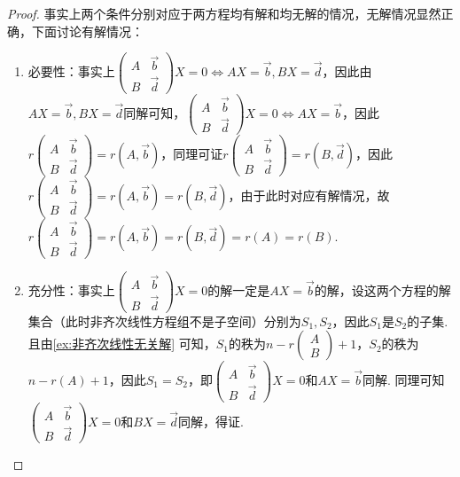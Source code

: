 \begin{proof}
    事实上两个条件分别对应于两方程均有解和均无解的情况，无解情况显然正确，下面讨论有解情况：
    \begin{enumerate}
        \item 必要性：事实上$\begin{pmatrix}
                      A & \vec{b} \\ B & \vec{d}
                  \end{pmatrix}X=0\iff AX=\vec{b},BX=\vec{d}$，因此由$AX=\vec{b},BX=\vec{d}$同解可知，$\begin{pmatrix}
                      A & \vec{b} \\ B & \vec{d}
                  \end{pmatrix}X=0\iff AX=\vec{b}$，因此$r\begin{pmatrix}
                      A & \vec{b} \\ B & \vec{d}
                  \end{pmatrix}=r(A,\vec{b})$，同理可证$r\begin{pmatrix}
                      A & \vec{b} \\ B & \vec{d}
                  \end{pmatrix}=r(B,\vec{d})$，因此$r\begin{pmatrix}
                      A & \vec{b} \\ B & \vec{d}
                  \end{pmatrix}=r(A,\vec{b})=r(B,\vec{d})$，由于此时对应有解情况，故$r\begin{pmatrix}
                      A & \vec{b} \\ B & \vec{d}
                  \end{pmatrix}=r(A,\vec{b})=r(B,\vec{d})=r(A)=r(B)$.

        \item 充分性：事实上$\begin{pmatrix}
                      A & \vec{b} \\ B & \vec{d}
                  \end{pmatrix}X=0$的解一定是$AX=\vec{b}$的解，设这两个方程的解集合（此时非齐次线性方程组不是子空间）分别为$S_1,S_2$，因此$S_1$是$S_2$的子集. 且由\autoref{ex:非齐次线性无关解} 可知，$S_1$的秩为$n-r\begin{pmatrix}
                      A \\ B
                  \end{pmatrix}+1$，$S_2$的秩为$n-r(A)+1$，因此$S_1=S_2$，即$\begin{pmatrix}
                      A & \vec{b} \\ B & \vec{d}
                  \end{pmatrix}X=0$和$AX=\vec{b}$同解. 同理可知$\begin{pmatrix}
                      A & \vec{b} \\ B & \vec{d}
                  \end{pmatrix}X=0$和$BX=\vec{d}$同解，得证.
    \end{enumerate}
\end{proof}

